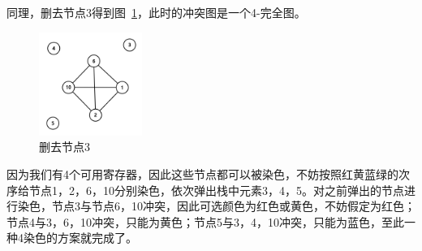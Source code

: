 同理，删去节点3得到图~\ref{fig:graph3}，此时的冲突图是一个4-完全图。

\begin{figure}[htb]
  \centering
  \includegraphics[width=0.3\textwidth]{figures/graph3.png}
  \caption{删去节点3}
  \label{fig:graph3}
\end{figure}

因为我们有4个可用寄存器，因此这些节点都可以被染色，不妨按照红黄蓝绿的次序给节点1，2，6，10分别染色，依次弹出栈中元素3，4，5。对之前弹出的节点进行染色，节点3与节点6，10冲突，因此可选颜色为红色或黄色，不妨假定为红色；节点4与3，6，10冲突，只能为黄色；节点5与3，4，10冲突，只能为蓝色，至此一种4染色的方案就完成了。
